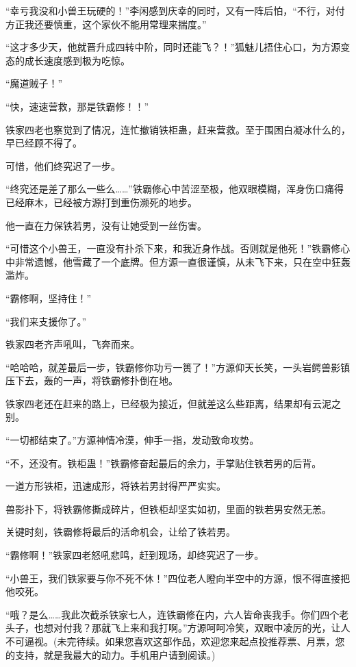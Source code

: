 \begin{this_body}
“幸亏我没和小兽王玩硬的！”李闲感到庆幸的同时，又有一阵后怕，“不行，对付方正我还要慎重，这个家伙不能用常理来揣度。”

“这才多少天，他就晋升成四转中阶，同时还能飞？！”狐魅儿捂住心口，为方源变态的成长速度感到极为吃惊。

“魔道贼子！”

“快，速速营救，那是铁霸修！！”

铁家四老也察觉到了情况，连忙撤销铁柜蛊，赶来营救。至于围困白凝冰什么的，早已经顾不得了。

可惜，他们终究迟了一步。

“终究还是差了那么一些么……”铁霸修心中苦涩至极，他双眼模糊，浑身伤口痛得已经麻木，已经被方源打到重伤濒死的地步。

他一直在力保铁若男，没有让她受到一丝伤害。

“可惜这个小兽王，一直没有扑杀下来，和我近身作战。否则就是他死！”铁霸修心中非常遗憾，他雪藏了一个底牌。但方源一直很谨慎，从未飞下来，只在空中狂轰滥炸。

“霸修啊，坚持住！”

“我们来支援你了。”

铁家四老齐声吼叫，飞奔而来。

“哈哈哈，就差最后一步，铁霸修你功亏一篑了！”方源仰天长笑，一头岩鳄兽影镇压下去，轰的一声，将铁霸修扑倒在地。

铁家四老还在赶来的路上，已经极为接近，但就差这么些距离，结果却有云泥之别。

“一切都结束了。”方源神情冷漠，伸手一指，发动致命攻势。

“不，还没有。铁柜蛊！”铁霸修奋起最后的余力，手掌贴住铁若男的后背。

一道方形铁柜，迅速成形，将铁若男封得严严实实。

兽影扑下，将铁霸修撕成碎片，但铁柜却坚实如初，里面的铁若男安然无恙。

关键时刻，铁霸修将最后的活命机会，让给了铁若男。

“霸修啊！”铁家四老怒吼悲鸣，赶到现场，却终究迟了一步。

“小兽王，我们铁家要与你不死不休！”四位老人瞪向半空中的方源，恨不得直接把他咬死。

“哦？是么……我此次截杀铁家七人，连铁霸修在内，六人皆命丧我手。你们四个老头子，也想对付我？那就飞上来和我打啊。”方源呵呵冷笑，双眼中凌厉的光，让人不可逼视。(未完待续。如果您喜欢这部作品，欢迎您来起点投推荐票、月票，您的支持，就是我最大的动力。手机用户请到阅读。)

\end{this_body}

